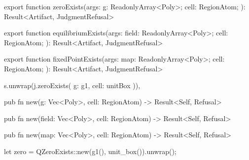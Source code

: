\begin{tssrc}
export function zeroExists(args: {
  g: ReadonlyArray<Poly>;
  cell: RegionAtom;
}): Result<Artifact, JudgmentRefusal>

export function equilibriumExists(args: {
  field: ReadonlyArray<Poly>;
  cell: RegionAtom;
}): Result<Artifact, JudgmentRefusal>

export function fixedPointExists(args: {
  map: ReadonlyArray<Poly>;
  cell: RegionAtom;
}): Result<Artifact, JudgmentRefusal>
\end{tssrc}
\begin{tssrc}
s.unwrap(j.zeroExists({ g: g1, cell: unitBox })),
\end{tssrc}
\begin{rustsrc}
pub fn new(g: Vec<Poly>, cell: RegionAtom) -> Result<Self, Refusal>

pub fn new(field: Vec<Poly>, cell: RegionAtom) -> Result<Self, Refusal>

pub fn new(map: Vec<Poly>, cell: RegionAtom) -> Result<Self, Refusal>
\end{rustsrc}
\begin{rustsrc}
let zero = QZeroExists::new(g1(), unit_box()).unwrap();
\end{rustsrc}
